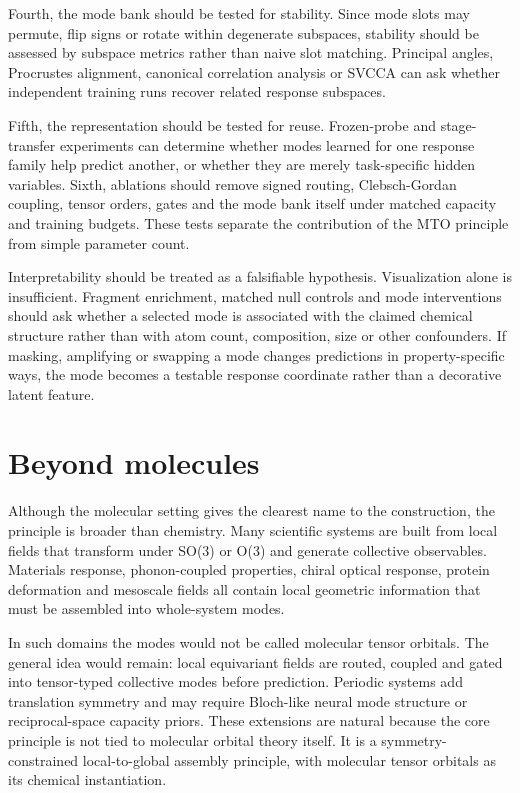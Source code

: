 \documentclass[11pt]{article}
\begin{document}
Fourth, the mode bank should be tested for stability. Since mode slots may permute, flip signs or rotate within degenerate subspaces, stability should be assessed by subspace metrics rather than naive slot matching. Principal angles, Procrustes alignment, canonical correlation analysis or SVCCA can ask whether independent training runs recover related response subspaces.

Fifth, the representation should be tested for reuse. Frozen-probe and stage-transfer experiments can determine whether modes learned for one response family help predict another, or whether they are merely task-specific hidden variables. Sixth, ablations should remove signed routing, Clebsch-Gordan coupling, tensor orders, gates and the mode bank itself under matched capacity and training budgets. These tests separate the contribution of the MTO principle from simple parameter count.

Interpretability should be treated as a falsifiable hypothesis. Visualization alone is insufficient. Fragment enrichment, matched null controls and mode interventions should ask whether a selected mode is associated with the claimed chemical structure rather than with atom count, composition, size or other confounders. If masking, amplifying or swapping a mode changes predictions in property-specific ways, the mode becomes a testable response coordinate rather than a decorative latent feature.

\section*{Beyond molecules}

Although the molecular setting gives the clearest name to the construction, the principle is broader than chemistry. Many scientific systems are built from local fields that transform under SO(3) or O(3) and generate collective observables. Materials response, phonon-coupled properties, chiral optical response, protein deformation and mesoscale fields all contain local geometric information that must be assembled into whole-system modes.

In such domains the modes would not be called molecular tensor orbitals. The general idea would remain: local equivariant fields are routed, coupled and gated into tensor-typed collective modes before prediction. Periodic systems add translation symmetry and may require Bloch-like neural mode structure or reciprocal-space capacity priors. These extensions are natural because the core principle is not tied to molecular orbital theory itself. It is a symmetry-constrained local-to-global assembly principle, with molecular tensor orbitals as its chemical instantiation.
\end{document}
